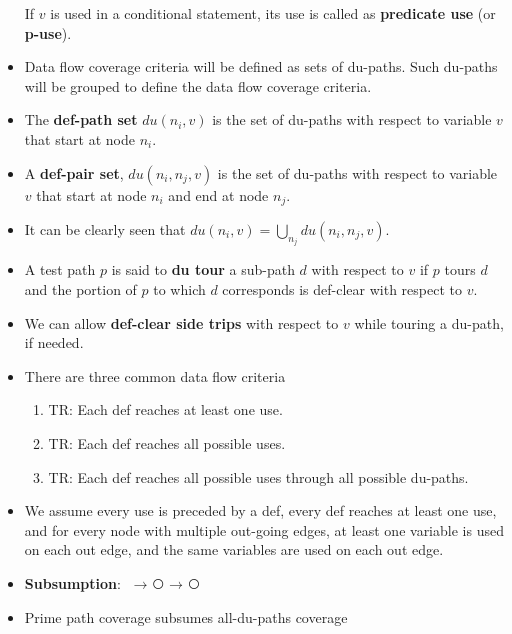 \documentclass[a4paper]{article}
\begin{document}
\begin{itemize}
    If $v$ is used in a conditional statement, its use is called as \textbf{predicate use} (or \textbf{p-use}).
    \item Data flow coverage criteria will be defined as sets of du-paths. Such du-paths will be grouped to define the data flow coverage criteria.
    \item The \textbf{def-path set} $du(n_i,v)$ is the set of du-paths with respect to variable $v$ that start at node $n_i$.
    \item A \textbf{def-pair set}, $du(n_i,n_j,v)$ is the set of du-paths with respect to variable $v$ that start at node $n_i$ and end at node $n_j$.
    \item It can be clearly seen that $du(n_i,v)=\bigcup_{n_j}du(n_i,n_j,v)$.
    \item A test path $p$ is said to \textbf{du tour} a sub-path $d$ with respect to $v$ if $p$ tours $d$ and the portion of $p$ to which $d$ corresponds is def-clear with respect to $v$.
    \item We can allow \textbf{def-clear side trips} with respect to $v$ while touring a du-path, if needed.
    \item There are three common data flow criteria
    \begin{enumerate}
        \item TR: Each def reaches at least one use.\label{enum:ST-data-flow-1}
        \item TR: Each def reaches all possible uses.\label{enum:ST-data-flow-2}
        \item TR: Each def reaches all possible uses through all possible du-paths.\label{enum:ST-data-flow-3}
    \end{enumerate}
    \item We assume every use is preceded by a def, every def reaches at least one use, and for every node with multiple out-going edges, at least one variable is used on each out edge, and the same variables are used on each out edge.
    \item\textbf{Subsumption}: \textcircled{\raisebox{-0.9pt}{\ref{enum:ST-data-flow-3}}}$\rightarrow$\textcircled{\raisebox{-0.9pt}{\ref{enum:ST-data-flow-2}}}$\rightarrow$\textcircled{\raisebox{-0.9pt}{\ref{enum:ST-data-flow-1}}}
    \item Prime path coverage subsumes all-du-paths coverage
\end{itemize}
\end{document}
